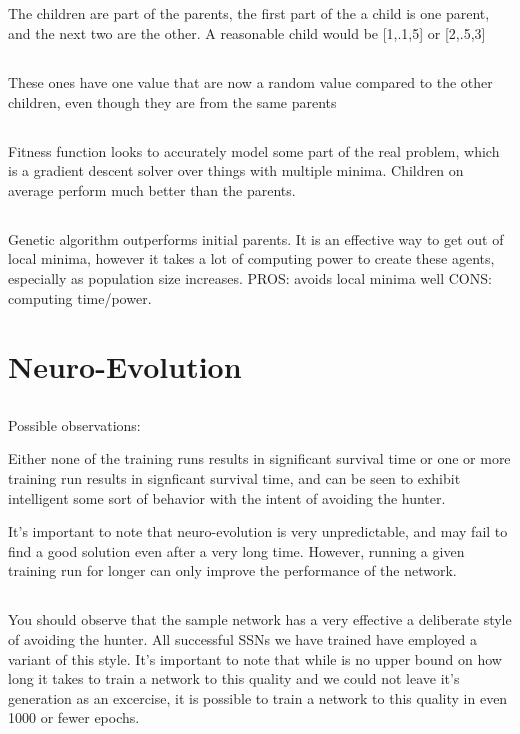 \documentclass[12]{extarticle}
\begin{document}
\subsection{}
The children are part of the parents, the first part of the a child is one parent, and the next two are the other.  A reasonable child would be [1,.1,5] or [2,.5,3]
\subsection{}
These ones have one value that are now a random value compared to the other children, even though they are from the same parents
\subsection{}
Fitness function looks to accurately model some part of the real problem, which is a gradient descent solver over things with multiple minima. Children on average perform much better than the parents. 
\subsection{}
Genetic algorithm outperforms initial parents.  It is an effective way to get out of local minima, however it takes a lot of computing power to create these agents, especially as population size increases.  PROS: avoids local minima well CONS: computing time/power. 



\section{Neuro-Evolution}
\subsection{}
Possible observations: 

Either none of the training runs results in significant survival time
or one or more training run results in signficant survival time, and can be seen to exhibit intelligent some sort of behavior with the intent of avoiding the hunter. 

It's important to note that neuro-evolution is very unpredictable, and may fail to find a good solution even after a very long time. However, running a given training run for longer can only improve the performance of the network.


\subsection{}
 You should observe that the sample network has a very effective a deliberate style of avoiding the hunter. All successful SSNs we have trained have employed a variant of this style. It's important to note that while is no upper bound on how long it takes to train a network to this quality and we could not leave it's generation as an excercise, it is possible to train a network to this quality in even 1000 or fewer epochs. 
\end{document}
